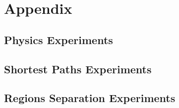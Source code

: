 \section{Appendix}

\subsection{Physics Experiments}

\subsection{Shortest Paths Experiments}

\subsection{Regions Separation Experiments}
